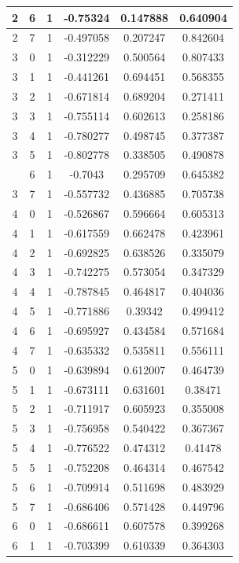\documentclass[12pt,a4paper]{article}
\numberwithin{equation}{section}
\numberwithin{figure}{section}
\numberwithin{table}{section}
\begin{document}
\begin{longtable}{|c|c|c|c|c|c|}
2 & 6 & 1 & -0.75324 & 0.147888 & 0.640904 \\ \hline
2 & 7 & 1 & -0.497058 & 0.207247 & 0.842604 \\ \hline
3 & 0 & 1 & -0.312229 & 0.500564 & 0.807433 \\ \hline
3 & 1 & 1 & -0.441261 & 0.694451 & 0.568355 \\ \hline
3 & 2 & 1 & -0.671814 & 0.689204 & 0.271411 \\ \hline
3 & 3 & 1 & -0.755114 & 0.602613 & 0.258186 \\ \hline
3 & 4 & 1 & -0.780277 & 0.498745 & 0.377387 \\ \hline
3 & 5 & 1 & -0.802778 & 0.338505 & 0.490878 \\ \hline
\pagebreak
3 & 6 & 1 & -0.7043 & 0.295709 & 0.645382 \\ \hline
3 & 7 & 1 & -0.557732 & 0.436885 & 0.705738 \\ \hline
4 & 0 & 1 & -0.526867 & 0.596664 & 0.605313 \\ \hline
4 & 1 & 1 & -0.617559 & 0.662478 & 0.423961 \\ \hline
4 & 2 & 1 & -0.692825 & 0.638526 & 0.335079 \\ \hline
4 & 3 & 1 & -0.742275 & 0.573054 & 0.347329 \\ \hline
4 & 4 & 1 & -0.787845 & 0.464817 & 0.404036 \\ \hline
4 & 5 & 1 & -0.771886 & 0.39342 & 0.499412 \\ \hline
4 & 6 & 1 & -0.695927 & 0.434584 & 0.571684 \\ \hline
4 & 7 & 1 & -0.635332 & 0.535811 & 0.556111 \\ \hline
5 & 0 & 1 & -0.639894 & 0.612007 & 0.464739 \\ \hline
5 & 1 & 1 & -0.673111 & 0.631601 & 0.38471 \\ \hline
5 & 2 & 1 & -0.711917 & 0.605923 & 0.355008 \\ \hline
5 & 3 & 1 & -0.756958 & 0.540422 & 0.367367 \\ \hline
5 & 4 & 1 & -0.776522 & 0.474312 & 0.41478 \\ \hline
5 & 5 & 1 & -0.752208 & 0.464314 & 0.467542 \\ \hline
5 & 6 & 1 & -0.709914 & 0.511698 & 0.483929 \\ \hline
5 & 7 & 1 & -0.686406 & 0.571428 & 0.449796 \\ \hline
6 & 0 & 1 & -0.686611 & 0.607578 & 0.399268 \\ \hline
6 & 1 & 1 & -0.703399 & 0.610339 & 0.364303 \\ \hline

\end{longtable}
\end{document}
